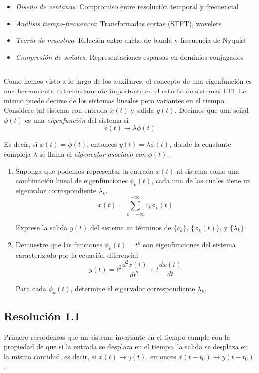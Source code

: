 \documentclass[
  11pt,
  letterpaper,
   addpoints,
   answers
  ]{exam}
\begin{document}
\begin{itemize}
\item \textit{Diseño de ventanas}: Compromiso entre resolución temporal y frecuencial
\item \textit{Análisis tiempo-frecuencia}: Transformadas cortas (STFT), wavelets
\item \textit{Teoría de muestreo}: Relación entre ancho de banda y frecuencia de Nyquist
\item \textit{Compresión de señales}: Representaciones esparsas en dominios conjugados
\end{itemize}
\noindent\rule{\textwidth}{0.4pt}
\newpage
\begin{questions}

\question 
Como hemos visto a lo largo de los auxiliares, el concepto de una eigenfunción es una herramienta extremadamente importante en el estudio de sistemas LTI. Lo mismo puede decirse de los sistemas lineales pero variantes en el tiempo. Considere tal sistema con entrada $x(t)$ y salida $y(t)$. Decimos que una señal $\phi(t)$ es una \textit{eigenfunción} del sistema si
$$\phi(t) \to \lambda\phi(t)$$

Es decir, si $x(t) = \phi(t)$, entonces $y(t) = \lambda\phi(t)$, donde la constante compleja $\lambda$ se llama el \textit{eigenvalor asociado con} $\phi(t)$.
\begin{enumerate}
  \item  Suponga que podemos representar la entrada $x(t)$ al sistema como una combinación lineal de eigenfunciones $\phi_k(t)$, cada una de las cuales tiene un eigenvalor correspondiente $\lambda_k$.
$$x(t) = \sum_{k=-\infty}^{+\infty} c_k\phi_k(t)$$

Exprese la salida $y(t)$ del sistema en términos de $\{c_k\}$, $\{\phi_k(t)\}$, y $\{\lambda_k\}$.

\item Demuestre que las funciones $\phi_k(t) = t^k$ son eigenfunciones del sistema caracterizado por la ecuación diferencial
$$y(t) = t^2 \frac{d^2x(t)}{dt^2} + t \frac{dx(t)}{dt}$$

Para cada $\phi_k(t)$, determine el eigenvalor correspondiente $\lambda_k$.
\end{enumerate}
\begin{solution}
\subsection*{Resolución 1.1}
Primero recordemos que un sistema invariante en el tiempo cumple con la propiedad de que si la entrada se desplaza en el tiempo, la salida se desplaza en la misma cantidad, es decir, si $x(t) \to y(t)$, entonces $x(t-t_0) \to y(t-t_0)$. 


\end{solution}
\end{questions}
\end{document}
